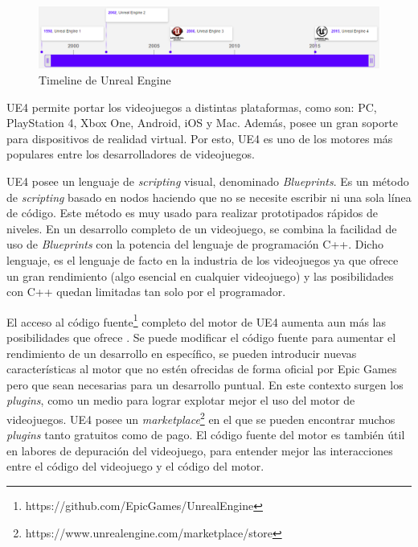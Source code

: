\begin{figure}[h]
\centering
\includegraphics[width=15cm]{./images/timeline.png}
\caption{Timeline de Unreal Engine}
\end{figure}

\acs{UE4} permite portar los videojuegos a distintas plataformas, como son: PC, PlayStation 4, Xbox One, Android, iOS y Mac. Además, posee un gran soporte para dispositivos de realidad virtual. Por esto, \acs{UE4} es uno de los motores más populares entre los desarrolladores de videojuegos. 

\acs{UE4} posee un lenguaje de \textit{scripting} visual, denominado \textit{Blueprints}. Es un método de \textit{scripting} basado en nodos haciendo que no se necesite escribir ni una sola línea de código. Este método es muy usado para realizar prototipados rápidos de niveles. En un desarrollo completo de un videojuego, se combina la facilidad de uso de \textit{Blueprints} con la potencia del lenguaje de programación C++. Dicho lenguaje, es el lenguaje de facto en la industria de los videojuegos ya que ofrece un gran rendimiento (algo esencial en cualquier videojuego) y las posibilidades con C++ quedan limitadas tan solo por el programador.

El acceso al código fuente\footnote{https://github.com/EpicGames/UnrealEngine} completo del motor de \acs{UE4} aumenta aun más las posibilidades que ofrece \cite{6}. Se puede modificar el código fuente para aumentar el rendimiento de un desarrollo en específico, se pueden introducir nuevas características al motor que no estén ofrecidas de forma oficial por Epic Games pero que sean necesarias para un desarrollo puntual. En este contexto surgen los \textit{plugins}, como un medio para lograr explotar mejor el uso del motor de videojuegos. \acs{UE4} posee un \textit{marketplace}\footnote{https://www.unrealengine.com/marketplace/store} en el que se pueden encontrar muchos \textit{plugins} tanto gratuitos como de pago. El código fuente del motor es también útil en labores de depuración del videojuego, para entender mejor las interacciones entre el código del videojuego y el código del motor.

